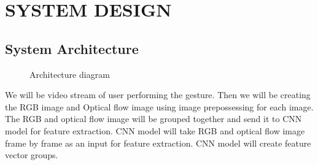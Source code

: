 \documentclass[oneside,a4paper,12pt]{report}
\begin{document}
            
            



        




\chapter{SYSTEM DESIGN}

    \section{System Architecture}
        
        \begin{center}
        	\begin{figure}[!hp]
        		\centering
        	  \caption{Architecture diagram}
        	  \label{fig:Architecture}
        	\end{figure}
        \end{center} 
        We will be video stream of user performing the gesture. Then we will be creating the RGB image and Optical flow image using image prepossessing for each image. The RGB and optical flow image will be grouped together and send it to CNN model for feature extraction.
        CNN model will take RGB and optical flow image frame by frame as an input for feature extraction. CNN model will create feature vector groups. 
        
\end{document}
